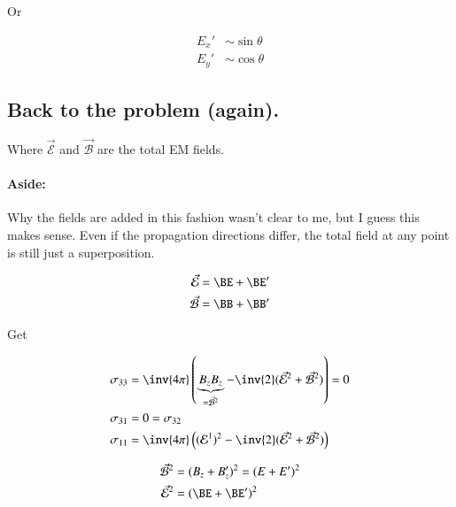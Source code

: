 Or

\begin{align}\label{eqn:relativisticElectrodynamicsT9:600}
E_x' &\sim \sin\theta \\
E_y' &\sim \cos\theta 
\end{align}

\subsection{Back to the problem (again).}

Where $\vec{\mathcal{E}}$ and $\vec{\mathcal{B}}$ are the total EM fields.

\paragraph{Aside:} Why the fields are added in this fashion wasn't clear to me, but I guess this makes sense.  Even if the propagation directions differ, the total field at any point is still just a superposition.

\begin{align}\label{eqn:relativisticElectrodynamicsT9:150}
\vec{\mathcal{E}} &= \BE + \BE' \\
\vec{\mathcal{B}} &= \BB + \BB'
\end{align}

Get 

\begin{align}\label{eqn:relativisticElectrodynamicsT9:170}
\sigma_{3 3} &= \inv{4 \pi} \left( \underbrace{B_z B_z}_{=\vec{\mathcal{B}}^2} - \inv{2} (\vec{\mathcal{E}}^2 + \vec{\mathcal{B}}^2) \right) = 0 \\
\sigma_{3 1} &= 0 = \sigma_{3 2} \\
\sigma_{1 1} &= \inv{4 \pi} \left( (\mathcal{E}^1)^2 - \inv{2} (\vec{\mathcal{E}}^2 + \vec{\mathcal{B}}^2) \right) 
\end{align}

\begin{align}\label{eqn:relativisticElectrodynamicsT9:190}
\vec{\mathcal{B}}^2 &= (B_z + B_z')^2 = (E + E')^2 \\
\vec{\mathcal{E}}^2 &= (\BE + \BE')^2
\end{align}

